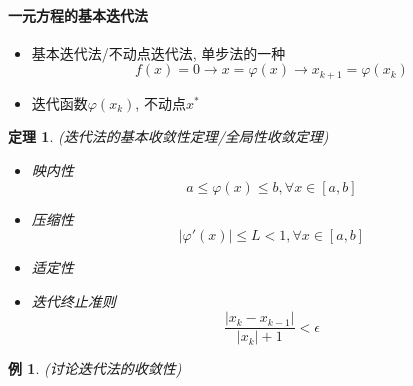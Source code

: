 \documentclass[twoside]{article}
\newtheorem{theorem}{定理}[section]
\newtheorem{eg}{例}[section]
\begin{document}
\paragraph{一元方程的基本迭代法}
\begin{itemize}
  \item 基本迭代法/不动点迭代法, 单步法的一种
    \begin{equation}
      f(x)=0 \to x=\varphi(x) \to x_{k+1}=\varphi(x_k)
    \end{equation}
  \item 迭代函数$\varphi(x_k)$, 不动点$x^*$
\end{itemize}
\begin{theorem}
  (迭代法的基本收敛性定理/全局性收敛定理)
  \begin{itemize}
    \item 映内性
      \begin{equation}
        a\le \varphi(x) \le b, \forall x\in[a,b]
      \end{equation}
    \item 压缩性
      \begin{equation}
        |\varphi'(x)|\le L < 1, \forall x\in[a,b]
      \end{equation}
    \item 适定性
    \item 迭代终止准则
      \begin{equation}
        \frac{|x_k-x_{k-1}|}{|x_k|+1}< \epsilon
      \end{equation}
  \end{itemize}
\end{theorem}
\begin{eg}
  (讨论迭代法的收敛性)
\end{eg}
\end{document}
